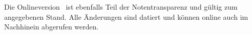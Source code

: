 \renewcommand\refname{\footnotesize Mathematische Notationen}
\renewcommand{\bibname}{Quellen}

\vfill


\begingroup
\tiny
\setlength{\bibsep}{0pt}


\endgroup

{\tiny Die Onlineversion \onlinedoc \, ist ebenfalls Teil der Notentransparenz und gültig zum angegebenen Stand. Alle Änderungen sind datiert und können online auch im Nachhinein abgerufen werden.}